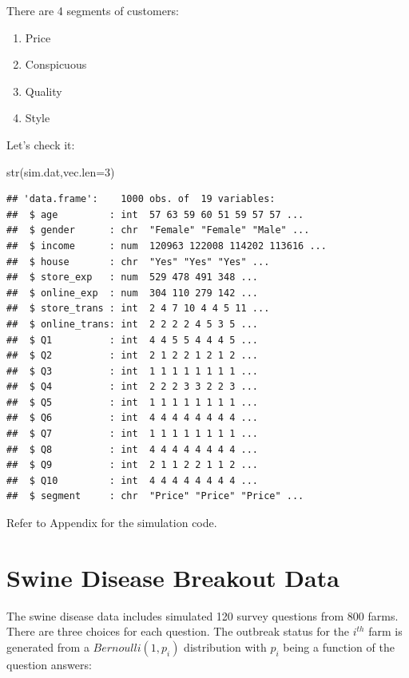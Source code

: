 \documentclass[
  12pt,
]{krantz}
\makeatletter
\newenvironment{Shaded}{\begin{snugshade}}{\end{snugshade}}
\newcommand{\AttributeTok}[1]{\textcolor[rgb]{0.61,0.61,0.61}{#1}}
\newcommand{\DecValTok}[1]{\textcolor[rgb]{0.06,0.06,0.06}{#1}}
\newcommand{\FunctionTok}[1]{\textcolor[rgb]{0,0,0}{#1}}
\newcommand{\NormalTok}[1]{#1}
\providecommand{\tightlist}{%
  \setlength{\itemsep}{0pt}\setlength{\parskip}{0pt}}
\newenvironment{kframe}{%
\medskip{}
\setlength{\fboxsep}{.8em}
 \def\at@end@of@kframe{}%
 \ifinner\ifhmode%
  \def\at@end@of@kframe{\end{minipage}}%
  \begin{minipage}{\columnwidth}%
 \fi\fi%
 \def\FrameCommand##1{\hskip\@totalleftmargin \hskip-\fboxsep
 \colorbox{shadecolor}{##1}\hskip-\fboxsep
     \hskip-\linewidth \hskip-\@totalleftmargin \hskip\columnwidth}%
 \MakeFramed {\advance\hsize-\width
   \@totalleftmargin\z@ \linewidth\hsize
   \@setminipage}}%
 {\par\unskip\endMakeFramed%
 \at@end@of@kframe}
\renewenvironment{Shaded}{\begin{kframe}}{\end{kframe}}
\makeatother
\begin{document}
There are 4 segments of customers:

\begin{enumerate}
\def\labelenumi{\arabic{enumi}.}
\tightlist
\item
  Price
\item
  Conspicuous
\item
  Quality
\item
  Style
\end{enumerate}

Let's check it:

\begin{Shaded}
\begin{Highlighting}[]
\FunctionTok{str}\NormalTok{(sim.dat,}\AttributeTok{vec.len=}\DecValTok{3}\NormalTok{)}
\end{Highlighting}
\end{Shaded}

\begin{verbatim}
## 'data.frame':    1000 obs. of  19 variables:
##  $ age         : int  57 63 59 60 51 59 57 57 ...
##  $ gender      : chr  "Female" "Female" "Male" ...
##  $ income      : num  120963 122008 114202 113616 ...
##  $ house       : chr  "Yes" "Yes" "Yes" ...
##  $ store_exp   : num  529 478 491 348 ...
##  $ online_exp  : num  304 110 279 142 ...
##  $ store_trans : int  2 4 7 10 4 4 5 11 ...
##  $ online_trans: int  2 2 2 2 4 5 3 5 ...
##  $ Q1          : int  4 4 5 5 4 4 4 5 ...
##  $ Q2          : int  2 1 2 2 1 2 1 2 ...
##  $ Q3          : int  1 1 1 1 1 1 1 1 ...
##  $ Q4          : int  2 2 2 3 3 2 2 3 ...
##  $ Q5          : int  1 1 1 1 1 1 1 1 ...
##  $ Q6          : int  4 4 4 4 4 4 4 4 ...
##  $ Q7          : int  1 1 1 1 1 1 1 1 ...
##  $ Q8          : int  4 4 4 4 4 4 4 4 ...
##  $ Q9          : int  2 1 1 2 2 1 1 2 ...
##  $ Q10         : int  4 4 4 4 4 4 4 4 ...
##  $ segment     : chr  "Price" "Price" "Price" ...
\end{verbatim}

Refer to Appendix for the simulation code.

\hypertarget{swinediseasedata}{%
\section{Swine Disease Breakout Data}\label{swinediseasedata}}

The swine disease data includes simulated 120 survey questions from 800 farms. There are three choices for each question. The outbreak status for the \(i^{th}\) farm is generated from a \(Bernoulli(1, p_i)\) distribution with \(p_i\) being a function of the question answers:
\end{document}
